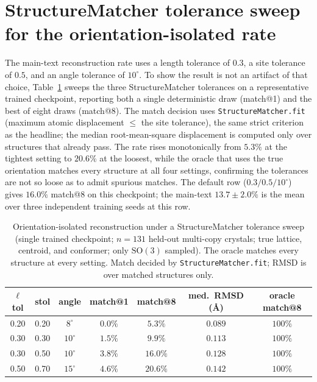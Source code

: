 \documentclass[10pt]{article}
\begin{document}
\section{StructureMatcher tolerance sweep for the orientation-isolated rate}
\label{app:sweep}

The main-text reconstruction rate uses a length tolerance of $0.3$, a site
tolerance of $0.5$, and an angle tolerance of $10^\circ$. To show the result is
not an artifact of that choice, Table~\ref{tab:sweep} sweeps the three
StructureMatcher tolerances on a representative trained checkpoint, reporting both
a single deterministic draw (match@1) and the best of eight draws (match@8). The
match decision uses \texttt{StructureMatcher.fit} (maximum atomic displacement
$\leq$ the site tolerance), the same strict criterion as the headline; the median
root-mean-square displacement is computed only over structures that already pass.
The rate rises monotonically from $5.3\%$ at the tightest setting to $20.6\%$ at
the loosest, while the oracle that uses the true orientation matches every
structure at all four settings, confirming the tolerances are not so loose as to
admit spurious matches. The default row ($0.3/0.5/10^\circ$) gives $16.0\%$
match@8 on this checkpoint; the main-text $13.7\pm2.0\%$ is the mean over three
independent training seeds at this row.

\begin{table}[h]
\centering
\caption{Orientation-isolated reconstruction under a StructureMatcher tolerance
sweep (single trained checkpoint; $n=131$ held-out multi-copy crystals; true
lattice, centroid, and conformer; only $\mathrm{SO}(3)$ sampled). The oracle
matches every structure at every setting. Match decided by
\texttt{StructureMatcher.fit}; RMSD is over matched structures only.}
\label{tab:sweep}
\begin{tabular}{ccccccc}
\toprule
$\ell$tol & stol & angle & match@1 & match@8 & med.\ RMSD (\AA) & oracle match@8 \\
\midrule
0.20 & 0.20 & $8^\circ$  & $0.0\%$ & $5.3\%$  & $0.089$ & $100\%$ \\
0.30 & 0.30 & $10^\circ$ & $1.5\%$ & $9.9\%$  & $0.113$ & $100\%$ \\
0.30 & 0.50 & $10^\circ$ & $3.8\%$ & $16.0\%$ & $0.128$ & $100\%$ \\
0.50 & 0.70 & $15^\circ$ & $4.6\%$ & $20.6\%$ & $0.142$ & $100\%$ \\
\bottomrule
\end{tabular}
\end{table}
\end{document}
